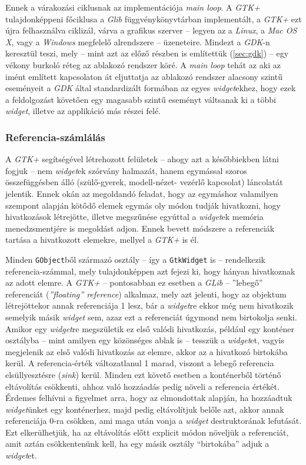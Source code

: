 Ennek a várakozási ciklusnak az implementációja \textit{main loop}. A \textit{GTK+} tulajdonképpeni főciklusa a \textit{Glib} függvénykönyvtárban implementált, a \textit{GTK+} ezt újra felhasználva ciklizál, várva a grafikus szerver -- legyen az a \textit{Linux}, a \textit{Mac OS X}, vagy a \textit{Windows} megfelelő alrendszere -- üzeneteire. Mindezt a \textit{GDK}-n keresztül teszi, mely -- mint azt az előző részben is említettük (\ref{sec:gdk}) -- egy vékony burkoló réteg az ablakozó rendszer köré. A \textit{main loop} tehát az aki az imént említett kapcsolaton át eljuttatja az ablakozó rendszer alacsony szintű eseményeit a \textit{GDK} által standardizált formában az egyes \textit{widget}ekhez, hogy ezek a feldolgozást követően egy magasabb szintű eseményt váltsanak ki a többi \textit{widget}, illetve az applikáció más részei felé.

\subsubsection{Referencia-számlálás}

A \textit{GTK+} segítségével létrehozott felületek -- ahogy azt a későbbiekben látni fogjuk -- nem \textit{widget}ek szórvány halmazát, hanem egymással szoros összefüggésben álló (szülő-gyerek, modell-nézet- vezérlő kapcsolat) láncolatát jelentik. Ennek okán az megoldandó feladat, hogy az egymáshoz valamilyen szempont alapján kötődő elemek egymás oly módon tudják hivatkozni, hogy hivatkozások létrejötte, illetve megszűnése egyúttal a \textit{widget}ek memória menedzsmentjére is megoldást adjon. Ennek bevett módszere a referenciák tartása a hivatkozott elemekre, mellyel a \textit{GTK+} is él.

Minden \texttt{GObject}ből származó osztály -- így a \texttt{GtkWidget} is -- rendelkezik referencia-számmal, mely tulajdonképpen azt fejezi ki, hogy hányan hivatkoznak az adott elemre. A \textit{GTK+} -- pontosabban ez esetben a \textit{GLib} -- ''lebegő'' referenciát (\textit{''floating'' reference}) alkalmaz, mely azt jelenti, hogy az objektum létrejöttekor annak referenciája 1 lesz, bár a \textit{widget}re ekkor még nem hivatkozik semelyik másik \textit{widget} sem, azaz ezt a referenciát úgymond nem birtokolja senki. Amikor egy \textit{widget}re megszületik ez első valódi hivatkozás, például egy konténer osztályba -- mint amilyen egy közönséges ablak is -- tesszük a \textit{widget}et, vagyis megjelenik az első valódi hivatkozás az elemre, akkor az a hivatkozó birtokába kerül. A referencia-érték változatlanul 1 marad, viszont a lebegő referencia elsüllyesztésre (\textit{sink}) kerül. Minden ezt követő esetben a konténerből történő eltávolítás csökkenti, ahhoz való hozzáadás pedig növeli a referencia értékét. Érdemes felhívni a figyelmet arra, hogy az elmondottak alapján, ha hozzáadtuk \textit{widget}ünket egy konténerhez, majd pedig eltávolítjuk belőle azt, akkor annak referenciája 0-ra csökken, ami maga után vonja a \textit{widget} destruktorának lefutását. Ezt elkerülhetjük, ha az eltávolítás előtt explicit módon növeljük a referenciát, amit aztán csökkentenünk kell, ha egy másik osztály ``birtokába'' adjuk a \textit{widget}et.

